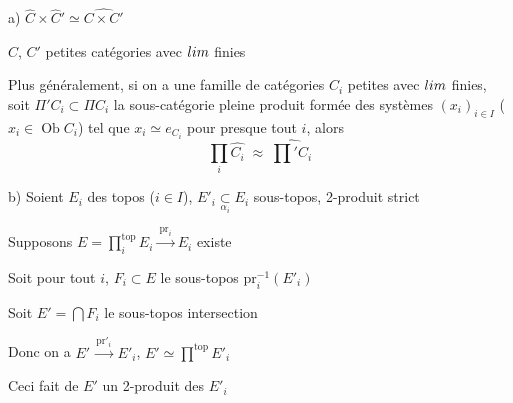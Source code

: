 \documentclass[11pt,a4paper]{article}
\begin{document}
a) $\widehat{C} \times \widehat{C}' \simeq \widehat{C \times C'}$

$C$, $C'$ petites catégories avec $\varprojlim$ finies

Plus généralement, si on a une famille de catégories $C_{i}$ petites avec
$\varprojlim$ finies, soit $\Pi' C_{i} \subset \Pi C_{i}$ la sous-catégorie
\struck{\ill{}} pleine produit formée des systèmes $(x_{i})_{i \in I}$
($x_{i} \in \operatorname{Ob} C_{i}$) tel que $x_{i} \simeq e_{C_{i}}$ pour
presque tout $i$, alors
\[
\prod_{i} \widehat{C_{i}} \;\approx\; \widehat{{\textstyle\prod}' C_{i}}
\]


b) Soient $E_{i}$ des topos ($i \in I$), $E'_{i} \underset{\alpha_{i}}{\subset}
E_{i}$ sous-topos, \ill{} 2-produit strict

Supposons $E = \prod_{i}^{\mathrm{top}} E_{i} \xrightarrow{\ \mathrm{pr}_{i}\ }
E_{i}$ existe

Soit pour tout $i$, $F_{i} \subset E$ le sous-topos
$\mathrm{pr}_{i}^{-1}(E'_{i})$

Soit $E' = \bigcap F_{i}$ le sous-topos intersection

Donc on a $E' \xrightarrow{\ \mathrm{pr}'_{i}\ } E'_{i}$, $E' \simeq
\prod^{\mathrm{top}} E'_{i}$

Ceci fait de $E'$ un 2-produit des $E'_{i}$

\end{document}
